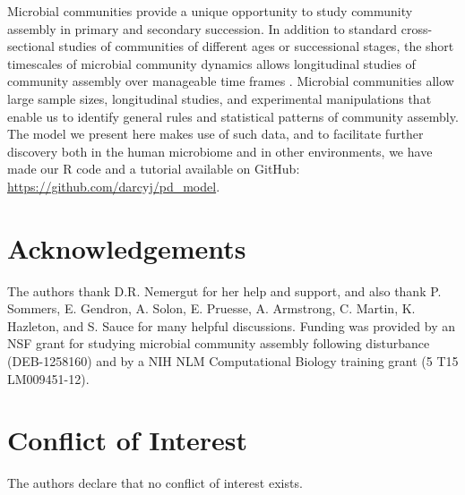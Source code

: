 \documentclass{article}
\begin{document}
\par
Microbial communities provide a unique opportunity to study community assembly in primary and secondary succession. In addition to standard cross-sectional studies of communities of different ages or successional stages, the short timescales of microbial community dynamics allows longitudinal studies of community assembly over manageable time frames \cite{David2014,Kennedy2016}. Microbial communities allow large sample sizes, longitudinal studies, and experimental manipulations that enable us to identify general rules and statistical patterns of community assembly. The model we present here makes use of such data, and to facilitate further discovery both in the human microbiome and in other environments, we have made our R code and a tutorial available on GitHub: \url{https://github.com/darcyj/pd_model}.

\section{Acknowledgements}
The authors thank D.R. Nemergut for her help and support, and also thank P. Sommers, E. Gendron, A. Solon, E. Pruesse, A. Armstrong, C. Martin, K. Hazleton, and S. Sauce for many helpful discussions. Funding was provided by an NSF grant for studying microbial community assembly following disturbance (DEB-1258160) and by a NIH NLM Computational Biology training grant (5 T15 LM009451-12).

\section{Conflict of Interest}
The authors declare that no conflict of interest exists.



\newpage
\end{document}
